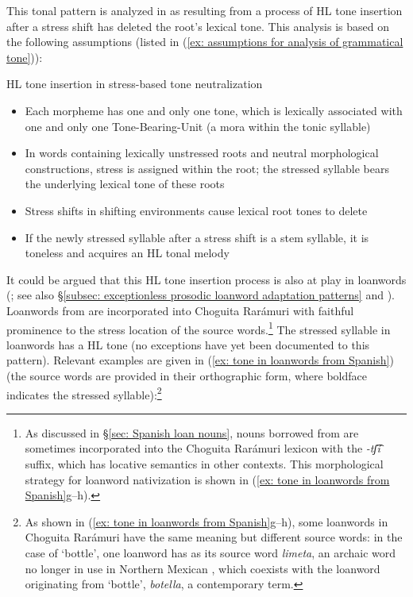 This tonal pattern is analyzed in \citet{caballero2021grammatical} as resulting from a process of HL tone insertion after a stress shift has deleted the root's lexical tone. This analysis is based on the following assumptions (listed in (\ref{ex: assumptions for analysis of grammatical tone})):

\ea\label{ex: assumptions for analysis of grammatical tone}
{HL tone insertion in stress-based tone neutralization}

\begin{itemize}
\item Each morpheme has one and only one tone, which is lexically associated with one and only one Tone-Bearing-Unit (a mora within the tonic syllable)
\item In words containing lexically unstressed roots and neutral morphological constructions, stress is assigned within the root; the stressed syllable bears the underlying lexical tone of these roots
\item Stress shifts in shifting environments cause lexical root tones to delete
\item If the newly stressed syllable after a stress shift is a stem syllable, it is toneless and acquires an HL tonal melody
\end{itemize}
\z

It could be argued that this HL tone insertion process is also at play in  loanwords (\citealt{caballero2013procesos}; see also §\ref{subsec: exceptionless prosodic loanword adaptation patterns} and ). Loanwords from  are incorporated into Choguita Rarámuri with faithful prominence to the stress location of the source words.\footnote{As
    discussed in §\ref{sec: Spanish loan nouns}, nouns borrowed from  are sometimes incorporated into the Choguita Rarámuri lexicon with the \textit{-tʃ͡í} suffix, which has locative semantics in other contexts. This morphological strategy for loanword nativization is shown in (\ref{ex: tone in loanwords from Spanish}g--h).
} The stressed syllable in loanwords has a HL tone (no exceptions have yet been documented to this pattern). Relevant examples are given in (\ref{ex: tone in loanwords from Spanish}) (the  source words are provided in their orthographic form, where boldface indicates the stressed syllable):\footnote{As shown in (\ref{ex: tone in loanwords from Spanish}g--h), some loanwords in Choguita Rarámuri have the same meaning but different source words: in the case of `bottle', one loanword has as its source word \textit{limeta}, an archaic word no longer in use in Northern Mexican , which coexists with the loanword originating from `bottle', \textit{botella}, a contemporary  term.}

